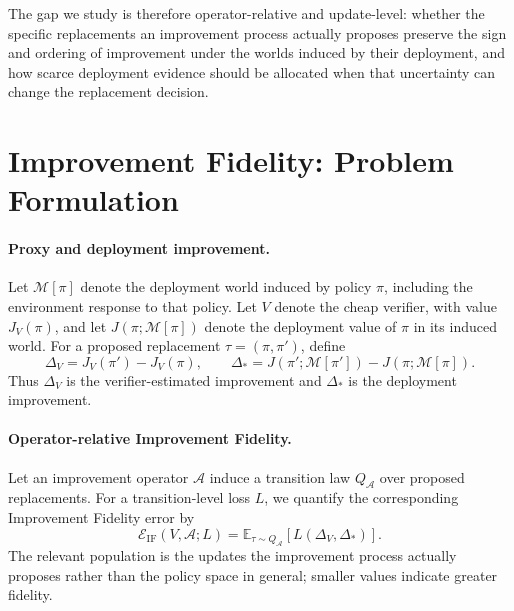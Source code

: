 \documentclass{article}
\newcommand{\E}{\mathbb{E}}
\newcommand{\M}{\mathcal{M}}
\newcommand{\pii}{\pi}
\newcommand{\pip}{\pi'}
\begin{document}
The gap we study is therefore operator-relative and update-level: whether the
specific replacements an improvement process actually proposes preserve the
sign and ordering of improvement under the worlds induced by their deployment,
and how scarce deployment evidence should be allocated when that uncertainty can
change the replacement decision.


\section{Improvement Fidelity: Problem Formulation}

\paragraph{Proxy and deployment improvement.}
Let $\M[\pi]$ denote the deployment world induced by policy $\pi$, including
the environment response to that policy. Let $V$ denote the cheap verifier,
with value $J_V(\pi)$, and let $J(\pi;\M[\pi])$ denote the deployment value
of $\pi$ in its induced world. For a
proposed replacement $\tau=(\pii,\pip)$, define
\begin{equation}
  \Delta_V=J_V(\pip)-J_V(\pii),
  \qquad
  \Delta_*=J(\pip;\M[\pip])-J(\pii;\M[\pii]).
  \label{eq:improvement}
\end{equation}
Thus $\Delta_V$ is the verifier-estimated improvement and $\Delta_*$ is the
deployment improvement.

\paragraph{Operator-relative Improvement Fidelity.}
Let an improvement operator $\mathcal A$ induce a transition law
$Q_{\mathcal A}$ over proposed replacements. For a transition-level loss $L$,
we quantify the corresponding Improvement Fidelity error by
\begin{equation}
  \mathcal E_{\mathrm{IF}}(V,\mathcal A;L)
  =
  \E_{\tau\sim Q_{\mathcal A}}
  [L(\Delta_V,\Delta_*)].
  \label{eq:if}
\end{equation}
The relevant population is the updates the improvement process actually
proposes rather than the policy space in general; smaller values indicate
greater fidelity.
\end{document}
